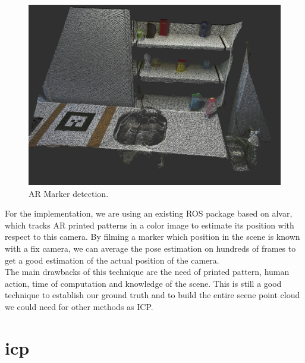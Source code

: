 \begin{figure}[h!]
    \centering
    \includegraphics[width=\textwidth]{images/marker_detection.png}
    \caption{AR Marker detection.}
    \label{fig:ar_marker}
\end{figure}

For the implementation, we are using an existing ROS package based on alvar, which tracks AR printed patterns in a color image to estimate its position with respect to this camera. By filming a marker which position in the scene is known with a fix camera, we can average the pose estimation on hundreds of frames to get a good estimation of the actual position of the camera. \\
The main drawbacks of this technique are the need of printed pattern, human action, time of computation and knowledge of the scene. This is still a good technique to establish our ground truth and to build the entire scene point cloud we could need for other methods as ICP. 


\section{\acrlong{icp}}

